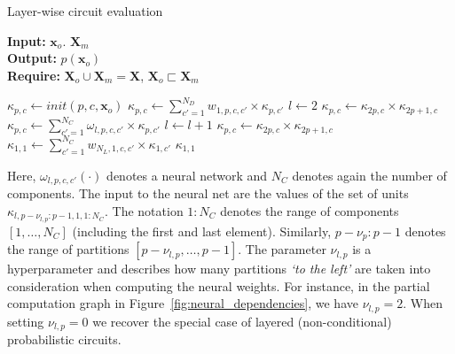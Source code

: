 \documentclass[letterpaper]{article} %
\newcommand{\Xvars}{\ensuremath{\mathbf{X}}}
\newcommand{\xvars}{\ensuremath{\mathbf{x}}}
\newcommand{\weight}{\ensuremath{w}}
\newcommand{\nweight}{\ensuremath{\omega}}
\newcommand{\component}{\ensuremath{{\kappa}}}
\begin{document}
\begin{algorithm}[t]
    \caption{Layer-wise circuit evaluation}
    \label{alg:layer}
    \hspace*{\algorithmicindent} \textbf{Input:} $\xvars_o$. $\Xvars_m$ \\
    \hspace*{\algorithmicindent} \textbf{Output:} $p(\xvars_o)$ \\
    \hspace*{\algorithmicindent} \textbf{Require:} $\Xvars_o {\cup} \Xvars_m {=} \Xvars$,  $\Xvars_o {\sqsubset} \Xvars_m$
    \begin{algorithmic}[1]
        \State $\component_{p,c} \gets init(p,c,\xvars_o)$
        \State $\component_{p,c} \gets
            \sum_{c'=1}^{N_D} \weight_{1,p,c,c'} \times \component_{p,c'}$ 
        \State $l \gets 2$
        \State $\component_{p,c} \gets \component_{2p,c} \times \component_{2p+1,c} $ 
        \State
        $ \component_{p,c}
            \gets
            \sum_{c'=1}^{N_C} \nweight_{l,p,c,c'}
            \times
            \component_{p,c'}
        $ 
        \State $l \gets l+1$
        \EndWhile
        \State $\component_{p,c} \gets \component_{2p,c} \times \component_{2p+1,c} $ 
        \State $\component_{1,1} \gets \sum_{c'=1}^{N_C} \weight_{N_L,1,c,c'} \times \component_{1,c'}$ 
        \State \Return $\component_{1,1}$
    \end{algorithmic}
\end{algorithm}



Here, $\nweight_{l,p,c,c'}(\cdot)$ denotes a neural network and $N_C$ denotes again the number of components. The input to the neural net are the values of the set of units $\component_{l, p-\nu_{l,p}{:}p-1, 1, 1{:}N_C}$. The notation $1{:}N_C$ denotes the range of components $[1,\dots,N_C]$ (including the first and last element). Similarly, $p{-}\nu_p{:}p{-}1$ denotes the range of partitions $[p{-}\nu_{l,p},\dots,p{-}1]$. The parameter $\nu_{l,p}$ is a hyperparameter and describes how many partitions \textit{`to the left'} are taken into consideration when computing the neural weights. For instance, in the partial computation graph in Figure~\ref{fig:neural_dependencies}, we have $\nu_{l,p}{=}2$. When setting $\nu_{l,p}{=}0$ we recover the special case of layered (non-conditional) probabilistic circuits.
\end{document}
